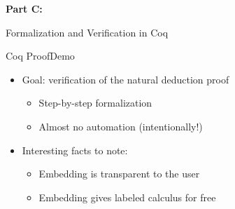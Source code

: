 \begin{transitionframe}
\textbf{Part C:}

Formalization and Verification in Coq
\end{transitionframe}

\begin{frame}{Coq Proof}{Demo} \small
\begin{itemize}
\item Goal: verification of the natural deduction proof
\begin{itemize}
\item Step-by-step formalization
\pause
\item Almost no automation (intentionally!)
\end{itemize}
%
\pause
\item Interesting facts to note:
\begin{itemize}
\item Embedding is transparent to the user
\pause
\item Embedding gives labeled calculus for free
\end{itemize}
\end{itemize}
\end{frame}
